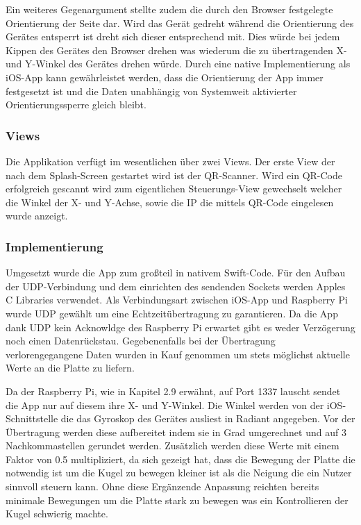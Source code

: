 \documentclass[12pt,a4paper,bibliography=totoc,listof=totoc]{scrartcl}
\begin{document}
Ein weiteres Gegenargument stellte zudem die durch den Browser festgelegte Orientierung der Seite dar. 
Wird das Gerät gedreht während die Orientierung des Gerätes entsperrt ist dreht sich dieser entsprechend mit. 
Dies würde bei jedem Kippen des Gerätes den Browser drehen was wiederum die zu übertragenden X- und Y-Winkel des Gerätes drehen würde. 
Durch eine native Implementierung als iOS-App kann gewährleistet werden, dass die Orientierung der App immer festgesetzt ist und die Daten 
unabhängig von Systemweit aktivierter Orientierungssperre gleich bleibt.

\subsubsection{Views}
Die Applikation verfügt im wesentlichen über zwei Views. Der erste View der nach dem Splash-Screen gestartet wird ist der QR-Scanner. 
Wird ein QR-Code erfolgreich gescannt wird zum eigentlichen Steuerungs-View gewechselt welcher die Winkel der X- und Y-Achse, sowie 
die IP die mittels QR-Code eingelesen wurde anzeigt.

\subsubsection{Implementierung}
Umgesetzt wurde die App zum großteil in nativem Swift-Code. Für den Aufbau der UDP-Verbindung und dem einrichten des sendenden Sockets
werden Apples C Libraries verwendet. Als Verbindungsart zwischen iOS-App und Raspberry Pi wurde UDP gewählt um eine Echtzeitübertragung zu garantieren. 
Da die App dank UDP kein Acknowldge des Raspberry Pi erwartet gibt es weder Verzögerung noch einen Datenrückstau. Gegebenenfalls bei
der Übertragung verlorengegangene Daten wurden in Kauf genommen um stets möglichst aktuelle Werte an die Platte zu liefern. 

Da der Raspberry Pi, wie in Kapitel 2.9 erwähnt, auf Port 1337 lauscht sendet die App nur auf diesem ihre X- und Y-Winkel. Die Winkel werden 
von der iOS-Schnittstelle die das Gyroskop des Gerätes ausliest in Radiant angegeben. Vor der Übertragung werden diese aufbereitet indem
sie in Grad umgerechnet und auf 3 Nachkommastellen gerundet werden. Zusätzlich werden diese Werte mit einem Faktor von 0.5 multipliziert, da sich
gezeigt hat, dass die Bewegung der Platte die notwendig ist um die Kugel zu bewegen kleiner ist als die Neigung die ein Nutzer sinnvoll steuern kann. 
Ohne diese Ergänzende Anpassung reichten bereits minimale Bewegungen um die Platte stark zu bewegen was ein Kontrollieren der Kugel schwierig machte.
\end{document}

